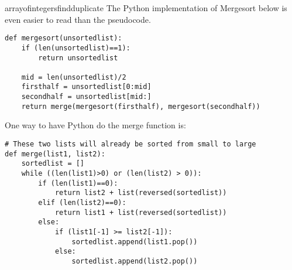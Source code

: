 \begin{answer}{arrayofintegersfindduplicate}
The Python implementation of Mergesort below is even easier to read than the pseudocode.
\begin{verbatim}
def mergesort(unsortedlist):
    if (len(unsortedlist)==1):
        return unsortedlist

    mid = len(unsortedlist)/2
    firsthalf = unsortedlist[0:mid]
    secondhalf = unsortedlist[mid:]
    return merge(mergesort(firsthalf), mergesort(secondhalf))
\end{verbatim}
One way to have Python do the merge function is:
\begin{verbatim}
# These two lists will already be sorted from small to large
def merge(list1, list2):
    sortedlist = []
    while ((len(list1)>0) or (len(list2) > 0)):
        if (len(list1)==0):
            return list2 + list(reversed(sortedlist))
        elif (len(list2)==0):
            return list1 + list(reversed(sortedlist))
        else:
            if (list1[-1] >= list2[-1]):
                sortedlist.append(list1.pop())
            else:
                sortedlist.append(list2.pop())

\end{verbatim}
\end{answer}
